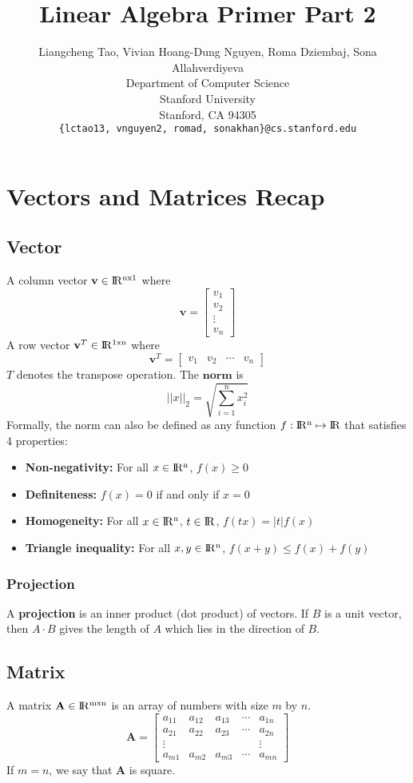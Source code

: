 \documentclass{article}
\title{Linear Algebra Primer Part 2}
\author{
  Liangcheng Tao, Vivian Hoang-Dung Nguyen, Roma Dziembaj, Sona Allahverdiyeva \\
  Department of Computer Science\\
  Stanford University\\
  Stanford, CA 94305 \\
  \texttt{\{lctao13, vnguyen2, romad, sonakhan\}@cs.stanford.edu} \\
}
\begin{document}
\maketitle

\section{Vectors and Matrices Recap}
\subsection{Vector}
A column vector $\textbf{v} \in {\rm I\!R^{nx1}}$ where $$ \textbf{v} = \begin{bmatrix}
    v_1 \\
    v_2 \\
    \vdots \\
    v_n
  \end{bmatrix}
 $$
\newline
A row vector $\textbf{v}^T \in {\rm I\!R^{1xn}}$ where $$ \textbf{v}^T = \begin{bmatrix}
    v_1 & v_2 & \cdots & v_n
  \end{bmatrix}
 $$
\newline
$T$ denotes the transpose operation.
\newline
\newline
The $\textbf{norm}$ is $$||x||_2 = \sqrt{\sum_{i=1}^{n} x_i^2}$$
Formally, the norm can also be defined as any function $f:{\rm I\!R^{n}} \mapsto {\rm I\!R}$ that satisfies 4 properties:
\begin{itemize}
\item \textbf{Non-negativity:} For all $x \in {\rm I\!R^{n}}$, $f(x) \geq 0$
\item \textbf{Definiteness:} $f(x) = 0$ if and only if $x = 0$
\item \textbf{Homogeneity:} For all $x \in {\rm I\!R^{n}}$, $t \in {\rm I\!R}$, $f(tx) = |t|f(x)$
\item \textbf{Triangle inequality:} For all $x,y \in {\rm I\!R^{n}}$, $f(x+y) \leq f(x) + f(y)$
\end{itemize}
\subsubsection{Projection}
A \textbf{projection} is an inner product (dot product) of vectors. If $B$ is a unit vector, then $A \cdot B$ gives the length of $A$ which lies in the direction of $B$.
\subsection{Matrix}
A matrix $\textbf{A} \in {\rm I\!R^{mxn}}$ is an array of numbers with size $m$ by $n$.
$$ \textbf{A} = \begin{bmatrix}
    a_{11} & a_{12} & a_{13} & \cdots & a_{1n} \\
    a_{21} & a_{22} & a_{23} & \cdots & a_{2n} \\
    \vdots & & & & \vdots \\
    a_{m1} & a_{m2} & a_{m3} & \cdots & a_{mn}
  \end{bmatrix}
$$
\newline
If $m=n$, we say that $\textbf{A}$ is square.
\end{document}
